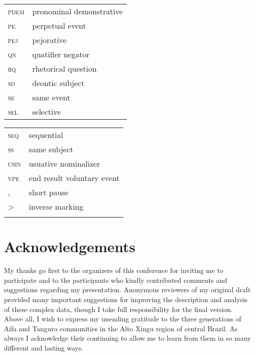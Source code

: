 \documentclass[output=paper]{langsci/langscibook}
\begin{document}
\begin{tabularx}{.54\textwidth}{lQ}
\textsc{pdem} & pronominal demonstrative\\ 
\textsc{pe} & perpetual event\\  
\textsc{pej} & pejorative \\
\textsc{qn} & quatifier negator\\
\textsc{rq} & rhetorical question\\ 
\textsc{sd} & deontic subject\\ 
\textsc{se} & same event\\
\textsc{sel} & selective\\ 
\end{tabularx}
\begin{tabularx}{.45\textwidth}{lQ}
\textsc{seq} & sequential\\ 
\textsc{ss} & same subject\\ 
\textsc{usin} & usuative  nominalizer\\ 
\textsc{vpe} & end result voluntary event\\
, & short pause\\ 
> &inverse marking\\
\\
\end{tabularx}

\section*{Acknowledgements}
My thanks go first to the organizers of this conference for inviting me to participate and to the participants who kindly contributed comments and suggestions regarding my presentation.   Anonymous reviewers of my original draft provided many important suggestions for improving the description and analysis of these complex data,  though I take full responsibility for the final version.  Above all, I wish to express my unending gratitude to the three generations of Aifa and Tanguro communities in the Alto Xingu region of central Brazil.  As always I acknowledge their continuing to allow me to learn from them in so many different and lasting ways.  

\largerpage
\sloppy
\printbibliography[heading=subbibliography,notkeyword=this] 
\end{document}
